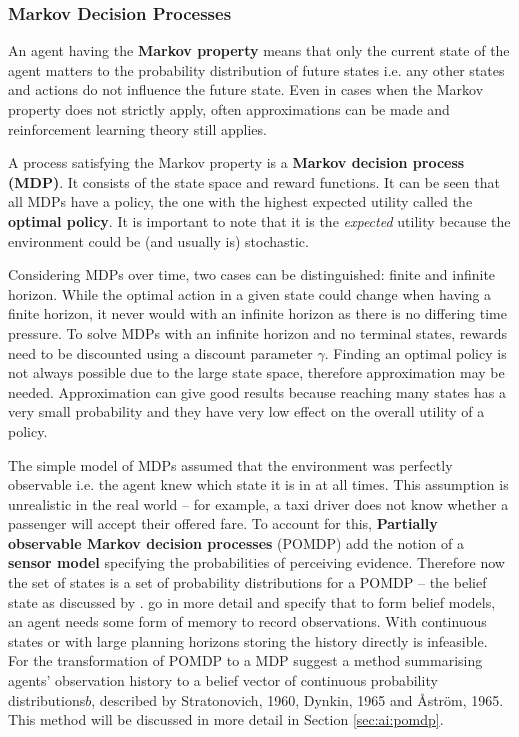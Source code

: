 \subsubsection{Markov Decision Processes}
\label{sec:ai:mdp}

An agent having the \textbf{Markov property} means that only the current state
of the agent matters to the probability distribution of future states i.e. any
other states and actions do not influence the future state. Even in cases when
the Markov property does not strictly apply, often approximations can be made
and reinforcement learning theory still applies.
\parencite{Sutton1998ai+reinforcement}

A process satisfying the Markov property is a
\textbf{Markov decision process (MDP)}. It consists of the state space and
reward functions. It can be seen that all MDPs have a policy, the one with the
highest expected utility called the \textbf{optimal policy}. It is important to
note that it is the \textit{expected} utility because the environment could be
(and usually is) stochastic. \parencite{Russell2010ai+modern}

Considering MDPs over time, two cases can be distinguished: finite and infinite
horizon. While the optimal action in a given state could change when having a
finite horizon, it never would with an infinite horizon as there is no
differing time pressure. To solve MDPs with an infinite horizon and no terminal
states, rewards need to be discounted using a discount parameter \(\gamma\).
Finding an optimal policy is not always possible due to the large state space,
therefore approximation may be needed. Approximation can give good results
because reaching many states has a very small probability and they have very
low effect on the overall utility of a policy. \parencite{Russell2010ai+modern}

The simple model of MDPs assumed that the environment was perfectly observable
i.e. the agent knew which state it is in at all times. This assumption is
unrealistic in the real world -- for example, a taxi driver does not know
whether a passenger will accept their offered fare. To account for this,
\textbf{Partially observable Markov decision processes} (POMDP) add the notion
of a \textbf{sensor model} specifying the probabilities of perceiving evidence.
Therefore now the set of states is a set of probability distributions for a
POMDP -- the belief state as discussed by \textcite{Russell2010ai+modern}.
\textcite{Spaan2012ai+pomdp} go in more detail and specify that to form belief
models, an agent needs some form of memory to record observations. With
continuous states or with large planning horizons storing the history directly
is infeasible. For the transformation of POMDP to a MDP
\textcite{Spaan2012ai+pomdp} suggest a method summarising agents' observation
history to a belief vector of continuous probability distributions\(b\),
described by Stratonovich, 1960, Dynkin, 1965 and Åström, 1965. This method
will be discussed in more detail in Section \ref{sec:ai:pomdp}.

